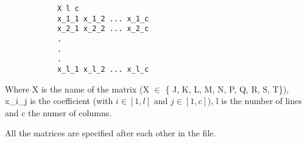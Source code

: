 		\begin{verbatim}
			X l c
			x_1_1 x_1_2 ... x_1_c
			x_2_1 x_2_2 ... x_2_c
			.
			.
			.
			x_l_1 x_l_2 ... x_l_c
		\end{verbatim}
		\vspace{-10pt}

		Where X is the name of the matrix (X $\in$ \{ J, K, L, M, N, P, Q, R, S, T\}), x\_i\_j is the coefficient (with $i \in [1, l]$ and $j \in [1, c]$), l is the number of lines and c the numer of columns.

		All the matrices are specified after each other in the file.




